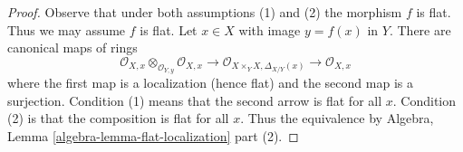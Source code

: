 \documentclass[10pt,a4paper]{amsart}
\theoremstyle{plain}
\theoremstyle{definition}
\theoremstyle{remark}
\numberwithin{equation}{subsection}
\begin{document}
\begin{proof}
Observe that under both assumptions (1) and (2) the morphism $f$ is flat.
Thus we may assume $f$ is flat. Let $x \in X$ with image $y = f(x)$ in $Y$.
There are canonical maps of rings
$$
\mathcal{O}_{X, x} \otimes_{\mathcal{O}_{Y, y}} \mathcal{O}_{X, x}
\longrightarrow
\mathcal{O}_{X \times_Y X, \Delta_{X/Y}(x)}
\longrightarrow
\mathcal{O}_{X, x}
$$
where the first map is a localization (hence flat) and the second map is a
surjection. Condition (1) means that the second arrow is flat for all $x$.
Condition (2) is that the composition is flat for all $x$. Thus the equivalence
by Algebra, Lemma \ref{algebra-lemma-flat-localization} part (2).
\end{proof}
\end{document}
